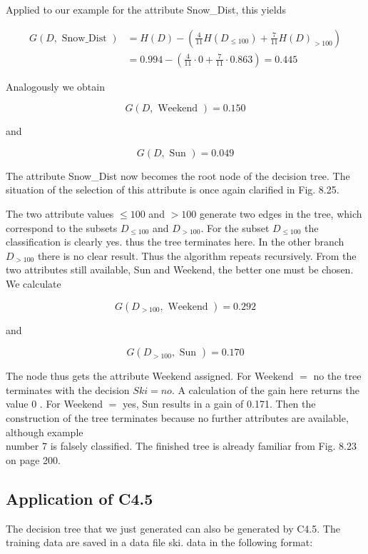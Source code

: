\documentclass[10pt]{book}
\begin{document}
Applied to our example for the attribute Snow\_Dist, this yields


$$
\begin{aligned}
G(D, \text { Snow_Dist }) & =H(D)-\left(\frac{4}{11} H\left(D_{\leq 100}\right)+\frac{7}{11} H(D)_{>100}\right) \\
& =0.994-\left(\frac{4}{11} \cdot 0+\frac{7}{11} \cdot 0.863\right)=0.445
\end{aligned}
$$

Analogously we obtain

$$
G(D, \text { Weekend })=0.150
$$

and

$$
G(D, \text { Sun })=0.049
$$

The attribute Snow\_Dist now becomes the root node of the decision tree. The situation of the selection of this attribute is once again clarified in Fig. 8.25.

The two attribute values $\leq 100$ and $>100$ generate two edges in the tree, which correspond to the subsets $D_{\leq 100}$ and $D_{>100}$. For the subset $D_{\leq 100}$ the classification is clearly yes. thus the tree terminates here. In the other branch $D_{>100}$ there is no clear result. Thus the algorithm repeats recursively. From the two attributes still available, Sun and Weekend, the better one must be chosen. We calculate

$$
G\left(D_{>100}, \text { Weekend }\right)=0.292
$$

and

$$
G\left(D_{>100}, \text { Sun }\right)=0.170
$$

The node thus gets the attribute Weekend assigned. For Weekend $=$ no the tree terminates with the decision $S k i=n o$. A calculation of the gain here returns the value 0 . For Weekend $=$ yes, Sun results in a gain of 0.171. Then the construction of the tree terminates because no further attributes are available, although example\\
number 7 is falsely classified. The finished tree is already familiar from Fig. 8.23 on page 200.

\subsection{Application of C4.5}
The decision tree that we just generated can also be generated by C4.5. The training data are saved in a data file ski. data in the following format:
\end{document}
